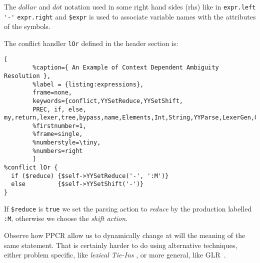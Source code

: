 The $dollar$ and $dot$ notation used in some right hand sides (rhs)  like in \verb|expr.left| \verb|'-'| \verb|expr.right|
and \verb|$expr| is used to associate variable names with the attributes of the symbols.

The conflict handler \verb|lOr| defined in the header section
is:
\begin{lstlisting}[
        %caption={ An Example of Context Dependent Ambiguity Resolution },
        %label = {listing:expressions},
        frame=none,
        keywords={conflict,YYSetReduce,YYSetShift,
        PREC, if, else, my,return,lexer,tree,bypass,name,Elements,Int,String,YYParse,LexerGen,Gen},
        %firstnumber=1, 
        %frame=single,
        %numberstyle=\tiny,
        %numbers=right
        ]
%conflict lOr {
  if ($reduce) {$self->YYSetReduce('-', ':M')} 
  else         {$self->YYSetShift('-')}
}
\end{lstlisting}
If \verb|$reduce| is \verb|true|
we set the parsing action to {\it reduce} by the production labelled \verb|:M|,
otherwise we choose the {\it shift action}.

Observe how PPCR allow us to dynamically change at will the meaning of the same statement.
That is certainly harder to do  using alternative techniques,
either problem specific, like {\it lexical Tie-Ins} \cite{bison}, or more general,
like \mbox{GLR \cite{tomita2}}.



